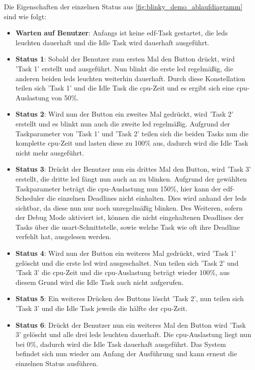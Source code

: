 \documentclass[../EDF Master Thesis.tex]{subfiles}
\begin{document}
    Die Eigenschaften der einzelnen Status aus \autoref{fig:blinky_demo_ablaufdiagramm} sind wie folgt:
    \begin{itemize}
        \item \textbf{Warten auf Benutzer}: Anfangs ist keine \ac{edf}-Task gestartet, die \ac{led}s leuchten dauerhaft und die Idle Task wird dauerhaft ausgeführt.
        \item \textbf{Status 1}: Sobald der Benutzer zum ersten Mal den Button drückt, wird 'Task 1' erstellt und ausgeführt.
            Nun blinkt die erste \ac{led} regelmäßig, die anderen beiden \ac{led}s leuchten weiterhin dauerhaft.
            Durch diese Konstellation teilen sich 'Task 1' und die Idle Task die \ac{cpu}-Zeit und es ergibt sich eine \ac{cpu}-Auslastung von 50\%.
        \item \textbf{Status 2}: Wird nun der Button ein zweites Mal gedrückt, wird 'Task 2' erstellt und es blinkt nun auch die zweite \ac{led} regelmäßig.
            Aufgrund der Taskparameter von 'Task 1' und 'Task 2' teilen sich die beiden Tasks nun die komplette \ac{cpu}-Zeit und lasten diese zu 100\% aus, dadurch wird die Idle Task nicht mehr ausgeführt.
        \item \textbf{Status 3}: Drückt der Benutzer nun ein drittes Mal den Button, wird 'Task 3' erstellt, die dritte \ac{led} fängt nun auch an zu blinken.
            Aufgrund der gewählten Taskparameter beträgt die \ac{cpu}-Auslastung nun 150\%, hier kann der \ac{edf}-Scheduler die einzelnen Deadlines nicht einhalten.
            Dies wird anhand der \ac{led}s sichtbar, da diese nun nur noch unregelmäßig blinken.
            Des Weiteren, sofern der Debug Mode aktiviert ist, können die nicht eingehaltenen Deadlines der Tasks über die \ac{usart}-Schnittstelle, sowie welche Task wie oft ihre Deadline verfehlt hat, ausgelesen werden.
        \item \textbf{Status 4}: Wird nun der Button ein weiteres Mal gedrückt, wird 'Task 1' gelöscht und die erste \ac{led} wird ausgeschaltet.
            Nun teilen sich 'Task 2' und 'Task 3' die \ac{cpu}-Zeit und die \ac{cpu}-Auslastung beträgt wieder 100\%, aus diesem Grund wird die Idle Task auch nicht aufgerufen.
        \item \textbf{Status 5}: Ein weiteres Drücken des Buttons löscht 'Task 2', nun teilen sich 'Task 3' und die Idle Task jeweils die hälfte der \ac{cpu}-Zeit.
        \item \textbf{Status 6}: Drückt der Benutzer nun ein weiteres Mal den Button wird 'Task 3' gelöscht und alle drei \ac{led}s leuchten dauerhaft.
            Die \ac{cpu}-Auslastung liegt nun bei 0\%, dadurch wird die Idle Task dauerhaft ausgeführt.
            Das System befindet sich nun wieder am Anfang der Ausführung und kann erneut die einzelnen Status ausführen.
    \end{itemize}
\end{document}

